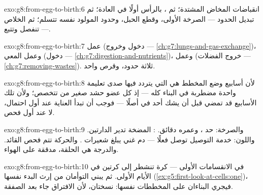 \begin{solution}{exo:g8:from-egg-to-birth:6}
انقباضات المخاض المشتدة؛ ثم ، بالرأس أولًا في
العادة؛ ثم تبديل الحدود --- الصرخة الأولى، وقطع الحبل،
وحدود المولود نفسه تتسلم؛ ثم الخلاص ---  تنفصل
وتتبع.
\end{solution}

\begin{solution}{exo:g8:from-egg-to-birth:7}
عمل  (دخول  وخروج  ---
\cref{ch:g7:lungs-and-gas-exchange})، وعمل المعي (دخول
 --- \cref{ch:g7:digestion-and-nutrients})، وعمل
 (خروج الفضلات --- \cref{ch:g7:removing-wastes}).
ثلاثة حدود، وقرص واحد.
\end{solution}

\begin{solution}{exo:g8:from-egg-to-birth:8}
لأن أسابيع وضع المخطط هي التي يتردد فيها صدى تعليمة
واحدة مضطربة في البناء كله --- إذ كل عضو حشد صغير من
 تتخصص؛ ولأن تلك الأسابيع قد تمضي قبل أن يشك أحد في
 أصلًا --- فوجب أن تبدأ العناية عند أول احتمال، لا
عند أول فحص.
\end{solution}

\begin{solution}{exo:g8:from-egg-to-birth:9}
 والصرخة: حد ، وعمره دقائق. :
المضخة تدير الدارتين. واللون: خدمة التوصيل توصل فعلًا ---
دم غني  يبلغ شعيرات . والحركة تتم فحص
القائد. والدرجة هي الحلقة، مدققة على الهواء.
\end{solution}

\begin{solution}{exo:g8:from-egg-to-birth:10}
في الانقسامات الأولى --- كرة  تنشطر إلى كرتين في
الأيام الأولى. ثم يبني التوأمان من إرث  البدء نفسها
(\cref{ex:g5:first-look-at-cells:one})، فيجري البناءان
على المخططات نفسها: نسختان، لأن الافتراق جاء بعد
الصفقة.
\end{solution}

